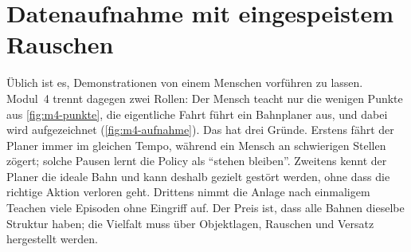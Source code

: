 \section{Datenaufnahme mit eingespeistem Rauschen}
\label{sec:m4-daten}

Üblich ist es, Demonstrationen von einem Menschen vorführen zu lassen. Modul~4 trennt dagegen
zwei Rollen: Der Mensch teacht nur die wenigen Punkte aus \cref{fig:m4-punkte}, die eigentliche
Fahrt führt ein Bahnplaner aus, und dabei wird aufgezeichnet (\cref{fig:m4-aufnahme}). Das hat
drei Gründe. Erstens fährt der Planer immer im gleichen Tempo, während ein Mensch an schwierigen
Stellen zögert; solche Pausen lernt die Policy als \enquote{stehen bleiben}. Zweitens kennt der
Planer die ideale Bahn und kann deshalb gezielt gestört werden, ohne dass die richtige Aktion
verloren geht. Drittens nimmt die Anlage nach einmaligem Teachen viele Episoden ohne Eingriff
auf. Der Preis ist, dass alle Bahnen dieselbe Struktur haben; die Vielfalt muss über Objektlagen,
Rauschen und Versatz hergestellt werden.

